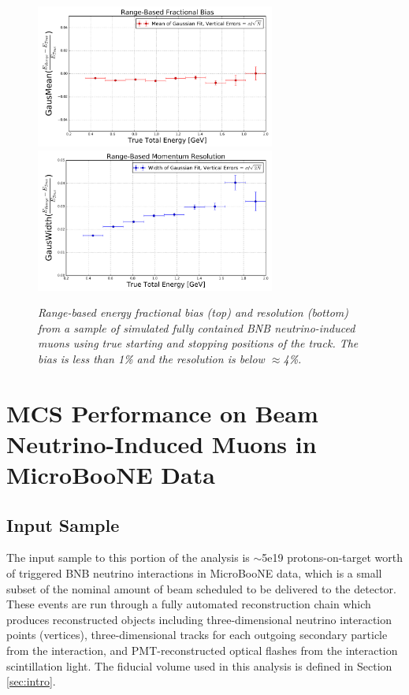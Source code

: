 \documentclass[a4paper,11pt]{article}
\begin{document}
\begin{figure}
\centering
\includegraphics[width=0.7\textwidth]
	{Figures/true_range_bias_MCBNBMCTrack.png}
\includegraphics[width=0.7\textwidth]
	{Figures/true_range_resolution_MCBNBMCTrack.png}
\caption{\textit{Range-based energy fractional bias (top) and resolution (bottom) from a sample of simulated fully contained BNB neutrino-induced muons using true starting and stopping positions of the track. The bias is less than 1\% and the resolution is below $\approx$4\%.}}
\label{true_range_bias_resolution_MCTrack_fig}
\end{figure}






\section{MCS Performance on Beam Neutrino-Induced Muons in MicroBooNE Data}\label{data_performance_section}

\subsection{Input Sample}\label{input_sample_section}
The input sample to this portion of the analysis is $\sim$5e19 protons-on-target worth of triggered BNB neutrino interactions in MicroBooNE data, which is a small subset of the nominal amount of beam scheduled to be delivered to the detector. These events are run through a fully automated reconstruction chain which produces reconstructed objects including three-dimensional neutrino interaction points (vertices), three-dimensional tracks for each outgoing secondary particle from the interaction, and PMT-reconstructed optical flashes from the interaction scintillation light. The fiducial volume used in this analysis is defined in Section \ref{sec:intro}.
\end{document}
